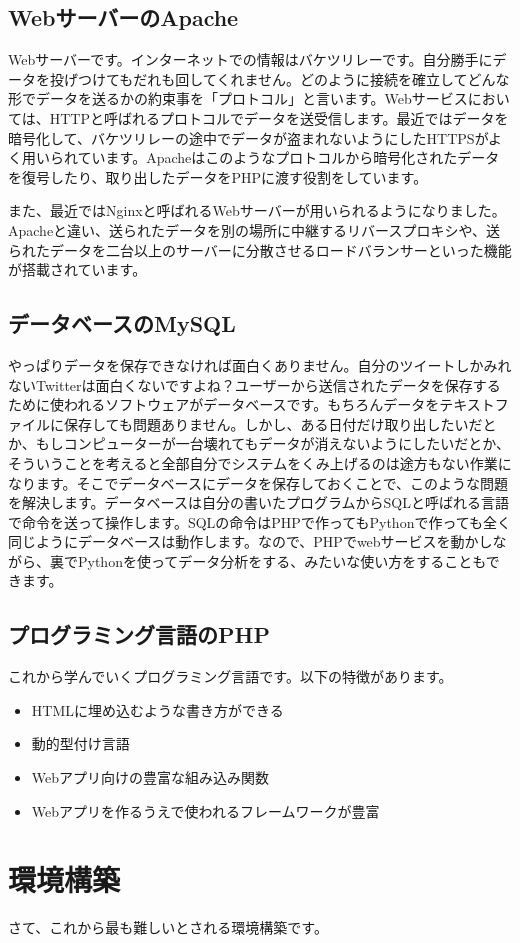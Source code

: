 \subsection{WebサーバーのApache}

Webサーバーです。インターネットでの情報はバケツリレーです。自分勝手にデータを投げつけてもだれも回してくれません。どのように接続を確立してどんな形でデータを送るかの約束事を「プロトコル」と言います。Webサービスにおいては、HTTPと呼ばれるプロトコルでデータを送受信します。最近ではデータを暗号化して、バケツリレーの途中でデータが盗まれないようにしたHTTPSがよく用いられています。Apacheはこのようなプロトコルから暗号化されたデータを復号したり、取り出したデータをPHPに渡す役割をしています。

また、最近ではNginxと呼ばれるWebサーバーが用いられるようになりました。Apacheと違い、送られたデータを別の場所に中継するリバースプロキシや、送られたデータを二台以上のサーバーに分散させるロードバランサーといった機能が搭載されています。

\subsection{データベースのMySQL}

やっぱりデータを保存できなければ面白くありません。自分のツイートしかみれないTwitterは面白くないですよね？ユーザーから送信されたデータを保存するために使われるソフトウェアがデータベースです。もちろんデータをテキストファイルに保存しても問題ありません。しかし、ある日付だけ取り出したいだとか、もしコンピューターが一台壊れてもデータが消えないようにしたいだとか、そういうことを考えると全部自分でシステムをくみ上げるのは途方もない作業になります。そこでデータベースにデータを保存しておくことで、このような問題を解決します。データベースは自分の書いたプログラムからSQLと呼ばれる言語で命令を送って操作します。SQLの命令はPHPで作ってもPythonで作っても全く同じようにデータベースは動作します。なので、PHPでwebサービスを動かしながら、裏でPythonを使ってデータ分析をする、みたいな使い方をすることもできます。

\subsection{プログラミング言語のPHP}

これから学んでいくプログラミング言語です。以下の特徴があります。

\begin{itemize}
  \item HTMLに埋め込むような書き方ができる
  \item 動的型付け言語
  \item Webアプリ向けの豊富な組み込み関数
  \item Webアプリを作るうえで使われるフレームワークが豊富
\end{itemize}

\section{環境構築}

さて、これから最も難しいとされる環境構築です。


